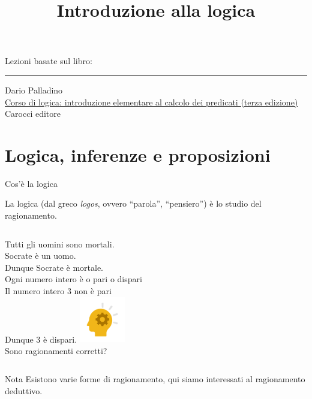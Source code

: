 \documentclass[10pt,dvipsnames]{beamer}
\title{Introduzione alla logica}
\begin{document}
\begin{frame}
	\titlepage
\end{frame}

\begin{frame}{}
	Lezioni basate sul libro:

	\smallskip
	\hrule

	\medskip
	Dario Palladino\\
	\href{https://www.carocci.it/prodotto/corso-di-logica-3}{Corso di logica: introduzione elementare al calcolo dei predicati (terza edizione)}\\
	Carocci editore\\

	\bigskip
	\centering
\end{frame}



\section{Logica, inferenze e proposizioni}

\begin{frame}{Cos'è la logica}
	\begin{definition}[Logica]
		La \alert{logica} (dal greco \textit{logos}, ovvero ``parola'', ``pensiero'') è lo studio del ragionamento.
	\end{definition}
	\begin{example}
		\begin{columns}
			\centering

			Tutti gli uomini sono mortali.\\
			Socrate è un uomo.\\
			Dunque Socrate è mortale.\\[0.6cm]
			Ogni numero intero è o pari o dispari\\
			Il numero intero 3 non è pari\\
			Dunque 3 è dispari.
			\centering
			\includegraphics[width=2cm,keepaspectratio]{logica.png}\\
			\alert{Sono ragionamenti corretti?}
		\end{columns}
	\end{example}
	\begin{block}{Nota}
		Esistono varie forme di ragionamento, qui siamo interessati al \alert{ragionamento deduttivo}.
	\end{block}
\end{frame}
\end{document}
